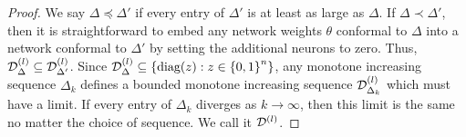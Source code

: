 
\limitingActivationSet*
\begin{proof}
    We say \( \Delta \preceq \Delta' \) if every entry of
    \( \Delta' \) is at least as large as \( \Delta \).
    If \( \Delta \prec \Delta' \), then it is straightforward to embed
    any network weights \( \theta \) conformal to \( \Delta \) into a network
    conformal to \( \Delta' \) by setting the additional neurons to zero.
    Thus, \( \mathcal{D}^{(l)}_{\Delta} \subseteq \mathcal{D}^{(l)}_{\Delta'} \).
    Since
    \( \mathcal{D}^{(l)}_{\Delta} \subseteq \left\{ \text{diag}(z) : z \in \left\{0, 1\right\}^n\right\} \),
    any monotone increasing sequence \( \Delta_{k} \) defines a bounded
    monotone increasing sequence \( \mathcal{D}^{(l)}_{\Delta_k} \) which must have
    a limit.
    If every entry of \( \Delta_k \) diverges as \( k \rightarrow \infty \),
    then this limit is the same no matter the choice of sequence.
    We call it \( \mathcal{D}^{(l)} \).
\end{proof}

